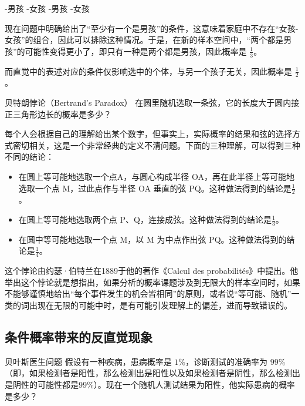 \begin{itemize}
-男孩
-女孩
-男孩
-女孩
\end{itemize}

现在问题中明确给出了“至少有一个是男孩”的条件，这意味着家庭中不存在“女孩-女孩”的组合，因此可以排除这种情况。于是，在新的样本空间中，“两个都是男孩”的可能性变得更小了，即只有一种是两个都是男孩，因此概率是 $\displaystyle\frac{1}{3}$。

而直觉中的表述对应的条件仅影响选中的个体，与另一个孩子无关，因此概率是 $\displaystyle\frac{1}{2}$。

\begin{example}{贝特朗悖论（Bertrand's Paradox）}
在圆里随机选取一条弦，它的长度大于圆内接正三角形边长的概率是多少？
\end{example}

每个人会根据自己的理解给出某个数字，但事实上，实际概率的结果和弦的选择方式密切相关，这是一个非常经典的定义不清问题。下面的三种理解，可以得到三种不同的结论：

\begin{itemize}
\item 在圆上等可能地选取一个点A，与圆心构成半径 OA，再在此半径上等可能地选取一个点 M，过此点作与半径 OA 垂直的弦 PQ。这种做法得到的结论是$\displaystyle\frac{1}{2}$。
\item 在圆上等可能地选取两个点 P、Q，连接成弦。这种做法得到的结论是$\displaystyle\frac{1}{3}$。
\item 在圆中等可能地选取一个点 M，以 M 为中点作出弦 PQ。这种做法得到的结论是$\displaystyle\frac{1}{4}$。
\end{itemize}

这个悖论由约瑟·伯特兰在1889于他的著作《Calcul des probabilités》中提出。他举出这个悖论就是想指出，如果分析的概率课题涉及到无限大的样本空间时，如果不能够谨慎地给出“每个事件发生的机会皆相同”的原则，或者说“等可能、随机”一类的词出现在无限的可能中时，是有可能引发理解上的偏差，进而导致错误的。

\subsection{条件概率带来的反直觉现象}

\begin{example}{贝叶斯医生问题}
假设有一种疾病，患病概率是 $1\%$，诊断测试的准确率为 $99\%$（即，如果检测者是阳性，那么检测出是阳性以及如果检测者是阴性，那么检测出是阴性的可能性都是$99\%$）。现在一个随机人测试结果为阳性，他实际患病的概率是多少？
\end{example}

